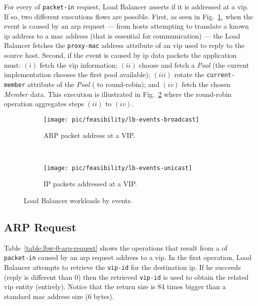 For every \gls{of} \texttt{packet-in} request, Load Balancer asserts if it is addressed at a \gls{vip}. If so, two different executions flows are possible. First, as seen in Fig.~\ref{fig:lb:interaction:arp2Vip}, when the event is caused by an \gls{arp} request --- from hosts attempting to translate a known \gls{ip} address to a \gls{mac} address (that is essential for communication) ---   the Load Balancer fetches the \texttt{proxy-mac} address attribute of an \gls{vip} used to reply to the source host. Second, if the event is caused by \gls{ip} data packets the application must: $(i)$ fetch the \gls{vip} information; $(ii)$ choose and fetch a \emph{Pool} (the current implementation chooses the first pool available); $(iii)$ rotate the \texttt{current-member} attribute of the \emph{Pool}  ( to round-robin); and $(iv)$  fetch the chosen  \emph{Member}  data. This execution is illustrated in Fig.~\ref{fig:lb:interaction:ip2Vip} where the round-robin operation aggregates steps $(ii)$ to $(iv)$.  

\begin{figure}
  \centering
  \begin{subfigure}[b]{0.5\textwidth}
                \centering
                \texttt{[image: pic/feasibility/lb-events-broadcast]}
                \caption{ARP packet address at a VIP.}
                \label{fig:lb:interaction:arp2Vip}
        \end{subfigure}%
        ~
        \begin{subfigure}[b]{0.5\textwidth}
                \centering
                \texttt{[image: pic/feasibility/lb-events-unicast]}
                \caption{IP packets addressed at a VIP. }
                \label{fig:lb:interaction:ip2Vip}
        \end{subfigure}
        \caption[Load Balancer workloads]{Load Balancer workloads by events.}  
        \label{fig:lb:interaction}
\end{figure}



\subsection{ARP Request}
Table~\ref{table:lbw-0-arp-request}  shows the operations that result from a \gls{of} \texttt{packet-in} caused by an \gls{arp} request address to a \gls{vip}. 
In the first operation, Load Balancer attempts to retrieve the \texttt{vip-id} for the destination \gls{ip}. If he succeeds (reply is different than 0) then the retrieved \texttt{vip-id} is used to obtain the related \gls{vip} entity (entirely). Notice that the return size is 84 times bigger than a standard \gls{mac} address size (6 bytes). 

